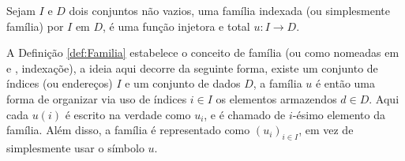 \begin{definicao}\label{def:Familia}
	Sejam $I$ e $D$ dois conjuntos não vazios, uma família indexada (ou simplesmente família) por $I$ em $D$, é uma função injetora e total $u: I \rightarrow D$.
\end{definicao}

A Definição \ref{def:Familia} estabelece o conceito de família (ou como nomeadas em \cite{halmos2001} e \cite{carmo2013}, indexaçõe), a ideia aqui decorre da seguinte forma, existe um conjunto de índices (ou endereços) $I$ e um conjunto de dados $D$, a família $u$ é então uma forma de organizar via uso de índices $i \in I$ os elementos armazendos $d \in D$. Aqui cada $u(i)$ é escrito na verdade como $u_i$, e é chamado de $i$-ésimo elemento da família. Além disso, a família é representado como $(u_i)_{i \in I}$, em vez de simplesmente usar o símbolo $u$. 











